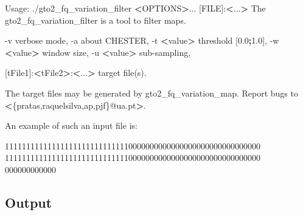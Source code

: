 \documentclass[11pt,]{krantz}
\newenvironment{Shaded}{\begin{snugshade}}{\end{snugshade}}
\newcommand{\KeywordTok}[1]{\textcolor[rgb]{0.27,0.27,0.27}{\textbf{#1}}}
\newcommand{\DataTypeTok}[1]{\textcolor[rgb]{0.27,0.27,0.27}{#1}}
\newcommand{\OperatorTok}[1]{\textcolor[rgb]{0.43,0.43,0.43}{\textbf{#1}}}
\newcommand{\BuiltInTok}[1]{#1}
\newcommand{\ExtensionTok}[1]{#1}
\newcommand{\NormalTok}[1]{#1}
\begin{document}
\begin{Shaded}
\begin{Highlighting}[]
\ExtensionTok{Usage}\NormalTok{: ./gto2_fq_variation_filter }\OperatorTok{<}\NormalTok{OPTIONS}\OperatorTok{>}\NormalTok{... [FILE]:}\OperatorTok{<}\NormalTok{...}\OperatorTok{>}      
\ExtensionTok{The}\NormalTok{ gto2_fq_variation_filter is a tool to filter maps.  }
                                                     
  \ExtensionTok{-v}\NormalTok{                       verbose mode,             }
  \ExtensionTok{-a}\NormalTok{                       about CHESTER,            }
  \ExtensionTok{-t} \OperatorTok{<}\NormalTok{value}\OperatorTok{>}\NormalTok{               threshold [0.0}\KeywordTok{;}\ExtensionTok{1.0}\NormalTok{],      }
  \ExtensionTok{-w} \OperatorTok{<}\NormalTok{value}\OperatorTok{>}\NormalTok{               window size,              }
  \ExtensionTok{-u} \OperatorTok{<}\NormalTok{value}\OperatorTok{>}\NormalTok{               sub-sampling,             }
                                                     
\NormalTok{  [}\ExtensionTok{tFile1}\NormalTok{]:}\OperatorTok{<}\NormalTok{tFile2}\OperatorTok{>}\NormalTok{:}\OperatorTok{<}\NormalTok{...}\OperatorTok{>}\NormalTok{  target file(s)}\BuiltInTok{.}           
                                                     
\ExtensionTok{The}\NormalTok{ target files may be generated by gto2_fq_variation_map.    }
\ExtensionTok{Report}\NormalTok{ bugs to }\OperatorTok{<}\DataTypeTok{\{pratas,raquelsilva,ap,pjf\}}\NormalTok{@ua.pt}\OperatorTok{>}\NormalTok{. }
\end{Highlighting}
\end{Shaded}

An example of such an input file is:

\begin{Shaded}
\begin{Highlighting}[]
\ExtensionTok{111111111111111111111111111110000000000000000000000000000000}
\ExtensionTok{111111111111111111111111111110000000000000000000000000000000}
\ExtensionTok{000000000000}
\end{Highlighting}
\end{Shaded}

\subsection*{Output}\label{output-24}
\end{document}
